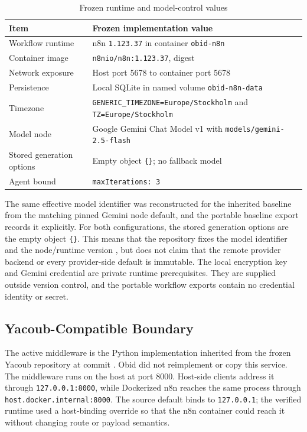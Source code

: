 \begin{table}[H]
\centering
\caption{Frozen runtime and model-control values}
\label{tab:impl-runtime}
\small
\begin{tabularx}{\textwidth}{L{0.31\textwidth}Y}
\toprule
\textbf{Item} & \textbf{Frozen implementation value} \\
\midrule
Workflow runtime & n8n \texttt{1.123.37} in container
\texttt{obid-n8n} \\
Container image & \texttt{n8nio/n8n:1.123.37}, digest
\texttt{} \\
Network exposure & Host port 5678 to container port 5678 \\
Persistence & Local SQLite in named volume \texttt{obid-n8n-data} \\
Timezone & \texttt{GENERIC\_TIMEZONE=Europe/Stockholm} and
\texttt{TZ=Europe/Stockholm} \\
Model node & Google Gemini Chat Model v1 with\newline
\texttt{models/gemini-2.5-flash} \\
Stored generation options & Empty object \texttt{\{\}}; no fallback model \\
Agent bound & \texttt{maxIterations: 3} \\
\bottomrule
\end{tabularx}
\end{table}

The same effective model identifier was reconstructed for the inherited
baseline from the matching pinned Gemini node default, and the portable
baseline export records it explicitly. For both configurations, the stored
generation options are the empty object \texttt{\{\}}. This means that the
repository fixes the model identifier and the node/runtime version
\cite{n8nNodeVersioning}, but does
not claim that the remote provider backend or every provider-side default is
immutable. The local encryption key and Gemini credential are private runtime
prerequisites. They are supplied outside version control, and the portable
workflow exports contain no credential identity or secret.

\subsection{Yacoub-Compatible Boundary}\label{subsec:impl-integration}

The active middleware is the Python implementation inherited from the frozen
Yacoub repository at commit
\texttt{}. Obid did not
reimplement or copy this service. The middleware runs on the host at port
8000. Host-side clients address it through \texttt{127.0.0.1:8000}, while
Dockerized n8n reaches the same process through
\texttt{host.docker.internal:8000}. The source default binds to
\texttt{127.0.0.1}; the verified runtime used a host-binding override so that
the n8n container could reach it without changing route or payload semantics.

